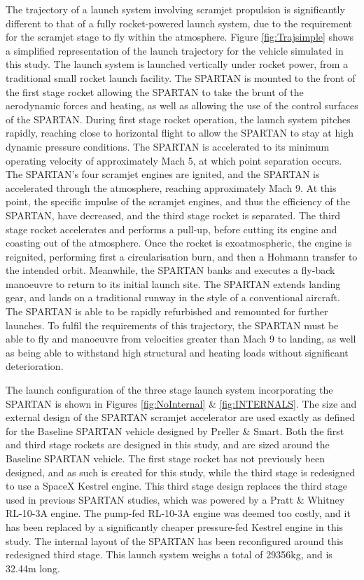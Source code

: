  The trajectory of a launch system involving scramjet propulsion is significantly different to that of a fully rocket-powered launch system, due to the requirement for the scramjet stage to fly within the atmosphere.
 Figure \ref{fig:Trajsimple} shows a simplified representation of the launch trajectory for the vehicle simulated in this study.
 The launch system is launched vertically under rocket power, from a traditional small rocket launch facility. The SPARTAN is mounted to the front of the first stage rocket allowing the SPARTAN to take the brunt of the aerodynamic forces and heating, as well as allowing the use of the control surfaces of the SPARTAN. During first stage rocket operation, the launch system pitches rapidly, reaching close to horizontal flight to allow the SPARTAN to stay at high dynamic pressure conditions. The SPARTAN is accelerated to its minimum operating velocity of approximately Mach 5, at which point separation occurs. The SPARTAN's four scramjet engines are ignited, and the SPARTAN is accelerated through the atmosphere, reaching approximately Mach 9. At this point, the specific impulse of the scramjet engines, and thus the efficiency of the SPARTAN, have decreased, and the third stage rocket is separated. The third stage rocket accelerates and performs a pull-up, before cutting its engine and coasting out of the atmosphere. Once the rocket is exoatmospheric, the engine is reignited, performing first a circularisation burn, and then a Hohmann transfer to the intended orbit. Meanwhile, the SPARTAN banks and executes a fly-back manoeuvre to return to its initial launch site. The SPARTAN extends landing gear, and lands on a traditional runway in the style of a conventional aircraft. The SPARTAN is able to be rapidly refurbished and remounted for further launches. To fulfil the requirements of this trajectory, the SPARTAN must be able to fly and manoeuvre from velocities greater than Mach 9 to landing, as well as being able to withstand high structural and heating loads without significant deterioration.
 
 The launch configuration of the three stage launch system incorporating the SPARTAN is shown in Figures \ref{fig:NoInternal} \& \ref{fig:INTERNALS}. 
 The size and external design of the SPARTAN scramjet accelerator are used exactly as defined for the Baseline SPARTAN vehicle designed by Preller \& Smart\cite{Preller2017b}. Both the first and third stage rockets are designed in this study, and are sized around the Baseline SPARTAN vehicle. 
 The first stage rocket has not previously been designed, and as such is created for this study, while the third stage is redesigned to use a SpaceX Kestrel engine. This third stage design replaces the third stage used in previous SPARTAN studies, which was powered by a Pratt \& Whitney RL-10-3A engine\cite{Preller2017b}. The pump-fed RL-10-3A engine was deemed too costly, and it has been replaced by a significantly cheaper pressure-fed Kestrel engine in this study.  
 The internal layout of the SPARTAN has been reconfigured around this redesigned third stage. 
 This launch system weighs a total of 29356kg, and is 32.44m long. 
 
